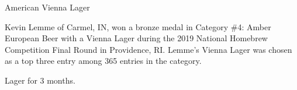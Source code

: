 \stylesection{\styleviennalager}

\begin{recipie}{American Vienna Lager}

\begin{aboutblock}
Kevin Lemme of Carmel, IN, won a bronze medal in Category \#4: Amber European Beer with
a Vienna Lager during the 2019 National Homebrew Competition Final Round in Providence,
RI. Lemme's Vienna Lager was chosen as a top three entry among 365 entries in the category.
\end{aboutblock}


\begin{methodandtiming}
 
\begin{mashsteps}
\end{mashsteps}

\begin{fermentationsteps}
\end{fermentationsteps}

\begin{directions}
Lager for 3 months.
\end{directions}

\end{methodandtiming}

\pagebreak

\begin{ingredientsblock}

\begin{malts}
\end{malts}

\begin{hops}
\end{hops}


\end{ingredientsblock}
\end{recipie}
